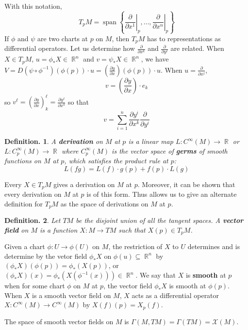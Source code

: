 \documentclass[11pt, a4paper]{memoir}
\DeclareMathOperator{\R}{{\mathbb{R}}}
\theoremstyle{change}
\theoremstyle{plain}
\theoremstyle{nonumberplain}
\newtheorem{definition}{Definition.}
\DeclareMathOperator{\spn}{span}
\newcommand{\prt}[2]{\ensuremath{\frac{\partial #1}{\partial #2}}}
\numberwithin{equation}{section}
\begin{document}
With this notation,
\begin{equation*}
    T_pM=\spn\left\{\left.\prt{}{x^1}\right\rvert_p,\ldots,\left.\prt{}{x^n}\right\rvert_p\right\}
\end{equation*}
If $\phi$ and $\psi$ are two charts at $p$ on $M$, then $T_pM$ has to representations as differential operators.
Let us determine how $\prt{}{x^k}$ and $\prt{}{y^\ell}$ are related.
When $X\in T_pM$, $u=\phi_*X\in\R^n$ and $v=\psi_*X\in\R^n$, we have $V=D(\psi\circ\phi^{-1})(\phi(p))\cdot u=\left(\prt{y}{x}\right)(\phi(p))\cdot u$.
When $u=\prt{}{x^j}$,
\begin{equation*}
    v=\left(\prt{y}{x}\right)\cdot e_k
\end{equation*}
so $v^\ell=\left(\prt{y}{x}\right)_k^\ell=\prt{y^\ell}{x^k}$ so that
\begin{equation*}
    v=\sum_{i=1}^n\prt{y^i}{x^k}\prt{}{y^i}
\end{equation*}
\begin{definition}
    A \textbf{derivation} on $M$ at $p$ is a linear map $L:C^\infty(M)\to\R$ or $L:C_p^\infty(M)\to\R$ where $C_p^\infty(M)$ is the vector space of \textbf{germs} of smooth functions on $M$ at $p$, which satisfies the product rule at $p$:
    \begin{equation*}
        L(fg)=L(f)\cdot g(p)+f(p)\cdot L(g)
    \end{equation*}
\end{definition}
Every $X\in T_pM$ gives a derivation on $M$ at $p$.
Moreover, it can be shown that every derivation on $M$ at $p$ is of this form.
Thus allows us to give an alternate definition for $T_pM$ as the space of derivations on $M$ at $p$.

\begin{definition}
    Let $TM$ be the disjoint union of all the tangent spaces.
    A \textbf{vector field} on $M$ is a function $X:M\to TM$ such that $X(p)\in T_pM$.
\end{definition}
Given a chart $\phi:U\to\phi(U)$ on $M$, the restriction of $X$ to $U$ determines and is determine by the vetor field $\phi_*X$ on $\phi(u)\subseteq\R^n$ by $(\phi_*X)(\phi(p))=\phi_*(X(p))$, or $(\phi_*X)(x)=\phi_*(X(\phi^{-1}(x)))\in\R^n$.
We say that $X$ is \textbf{smooth} at $p$ when for some chart $\phi$ on $M$ at $p$, the vector field $\phi_*X$ is smooth at $\phi(p)$.
When $X$ is a smooth vector field on $M$, $X$ acts as a differential operator $X:C^\infty(M)\to C^\infty(M)$ by $X(f)(p)=X_p(f)$.

The space of smooth vector fields on $M$ is $\Gamma(M,TM)=\Gamma(TM)=\mathcal{X}(M)$.
\end{document}
